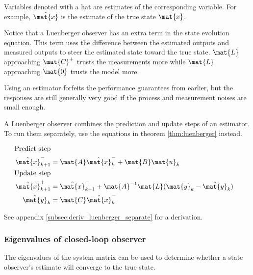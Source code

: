Variables denoted with a hat are estimates of the corresponding variable. For
example, $\hat{\mat{x}}$ is the estimate of the true \gls{state} $\mat{x}$.

Notice that a Luenberger \gls{observer} has an extra term in the \gls{state}
evolution equation. This term uses the difference between the estimated
\glspl{output} and measured \glspl{output} to steer the estimated \gls{state}
toward the true \gls{state}. $\mat{L}$ approaching $\mat{C}^+$ trusts the
measurements more while $\mat{L}$ approaching $\mat{0}$ trusts the \gls{model}
more.
\begin{remark}
  Using an estimator forfeits the performance guarantees from
  earlier, but the responses are still
  generally very good if the process and measurement noises are small enough.
\end{remark}

A Luenberger \gls{observer} combines the prediction and update steps of an
estimator. To run them separately, use the equations in theorem
\ref{thm:luenberger} instead.
\begin{theorem}
  \label{thm:luenberger}
  \begin{align}
    \text{Predict step} \nonumber \\
    \hat{\mat{x}}_{k+1}^- &= \mat{A}\hat{\mat{x}}_k^- + \mat{B}\mat{u}_k \\
    \text{Update step} \nonumber \\
    \hat{\mat{x}}_{k+1}^+ &= \hat{\mat{x}}_{k+1}^- + \mat{A}^{-1}\mat{L}
      (\mat{y}_k - \hat{\mat{y}}_k) \\
    \hat{\mat{y}}_k &= \mat{C} \hat{\mat{x}}_k^-
  \end{align}
\end{theorem}

See appendix \ref{subsec:deriv_luenberger_separate} for a derivation.

\subsubsection{Eigenvalues of closed-loop observer}

The eigenvalues of the system matrix can be used to determine whether a
\gls{state} \gls{observer}'s estimate will converge to the true \gls{state}.

